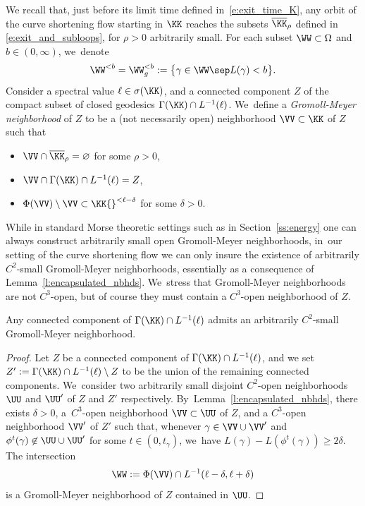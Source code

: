 We recall that, just before its limit time defined in~\eqref{e:exit_time_K}, any orbit of the curve shortening flow starting in $\KK$ reaches the subsets $\overline\KK_\rho$ defined in \eqref{e:exit_and_subloops}, for $\rho>0$ arbitrarily small.
For each subset $\WW\subset\Omega$ and $b\in(0,\infty)$, we~denote
\begin{align*}
\WW^{<b}=\WW_g^{<b}:=\big\{\gamma\in\WW\sep L(\gamma)<b\big\}.
\end{align*}
Consider a spectral value $\ell\in\sigma(\KK)$, and a connected component $Z$ of the compact subset of closed geodesics $\Gamma(\KK)\cap L^{-1}(\ell)$. We~define a \emph{Gromoll-Meyer neighborhood} of $Z$ to be a (not necessarily open) neighborhood $\VV\subset\KK$ of $Z$ such that
\begin{itemize}
\item $\VV\cap\overline\KK_\rho=\varnothing$ for some $\rho>0$,

\item $\VV\cap\Gamma(\KK)\cap L^{-1}(\ell)=Z$,

\item $\Phi(\VV)\setminus\VV\subset\KK{}^{<\ell-\delta}$ for some $\delta>0$.
\end{itemize}
While in standard Morse theoretic settings such as in Section~\ref{ss:energy} one can always construct arbitrarily small open Gromoll-Meyer neighborhoods, in~our setting of the curve shortening flow we can only insure the existence of arbitrarily $C^2$-small Gromoll-Meyer neighborhoods, essentially as a consequence of Lemma~\ref{l:encapsulated_nbhds}. We~stress that Gromoll-Meyer neighborhoods are not $C^3$-open, but of course they must contain a $C^3$-open neighborhood of $Z$.

\begin{Lemma}\label{l:GM_nbhds}
Any connected component of $\Gamma(\KK)\cap L^{-1}(\ell)$ admits an arbitrarily $C^2$\nobreakdash-small Gromoll-Meyer neighborhood.
\end{Lemma}

\begin{proof}
Let $Z$ be a connected component of $\Gamma(\KK)\cap L^{-1}(\ell)$, and we set $Z':=\Gamma(\KK)\cap\nobreak L^{-1}(\ell)\setminus Z$ to be the union of the remaining connected components. We~consider two arbitrarily small disjoint $C^2$-open neighborhoods $\UU$ and $\UU'$ of $Z$ and $Z'$ respectively. By~Lemma~\ref{l:encapsulated_nbhds}, there exists $\delta>0$, a~$C^3$-open neighborhood $\VV\subset\UU$ of $Z$, and a $C^3$-open neighborhood $\VV'$ of $Z'$ such that, whenever $\gamma\in\VV\cup\VV'$ and $\phi^t(\gamma)\not\in\UU\cup\UU'$ for some $t\in(0,t_\gamma)$, we~have $L(\gamma)-L(\phi^t(\gamma))\geq2\delta$. The intersection
\[
\WW:=\Phi(\VV)\cap L^{-1}(\ell-\delta,\ell+\delta)
\]
is a Gromoll-Meyer neighborhood of $Z$ contained in $\UU$.
\end{proof}

